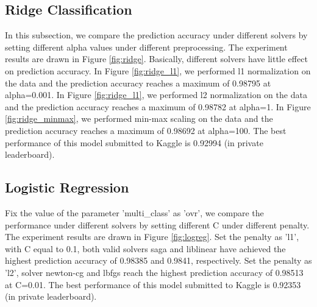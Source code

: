 \documentclass[10pt,journal,compsoc]{IEEEtran}
\begin{document}
\subsection{Ridge Classification}
\label{subsec:eva_ridge}
In this subsection, we compare the prediction accuracy under different solvers by setting different alpha values under different preprocessing. The experiment results are drawn in Figure \ref{fig:ridge}. Basically, different solvers have little effect on prediction accuracy. In Figure \ref{fig:ridge_l1}, we performed l1 normalization on the data and the prediction accuracy reaches a maximum of 0.98795 at alpha=0.001. In Figure \ref{fig:ridge_l1}, we performed l2 normalization on the data and the prediction accuracy reaches a maximum of 0.98782 at alpha=1. In Figure \ref{fig:ridge_minmax}, we performed min-max scaling on the data and the prediction accuracy reaches a maximum of 0.98692 at alpha=100. The best performance of this model submitted to Kaggle is 0.92994 (in private leaderboard).

\subsection{Logistic Regression}
\label{subsec:eva_logreg}

Fix the value of the parameter 'multi\_class' as 'ovr', we compare the performance under different solvers by setting different C under different penalty. The experiment results are drawn in Figure \ref{fig:logreg}. Set the penalty as 'l1', with C equal to 0.1, both valid solvers saga and liblinear have achieved the highest prediction accuracy of 0.98385 and 0.9841, respectively. Set the penalty as 'l2', solver newton-cg and lbfgs reach the highest prediction accuracy of 0.98513 at C=0.01. The best performance of this model submitted to Kaggle is 0.92353 (in private leaderboard).
\end{document}
